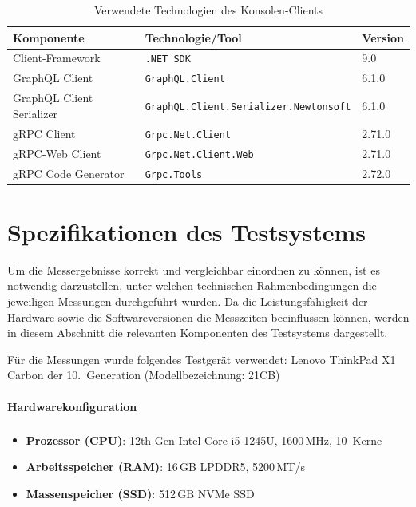 \begin{enumerate}
	\begin{table}[h]
		\centering
		\caption{Verwendete Technologien des Konsolen-Clients}
		\begin{tabular}{lll}
			\hline
			\textbf{Komponente} & \textbf{Technologie/Tool} & \textbf{Version} \\
			\hline
			Client-Framework & \texttt{.NET~SDK} & 9.0 \\
			GraphQL Client & \texttt{GraphQL.Client} & 6.1.0 \\
			GraphQL Client Serializer & \texttt{GraphQL.Client.Serializer.Newtonsoft} & 6.1.0 \\
			gRPC Client & \texttt{Grpc.Net.Client} & 2.71.0 \\
			gRPC-Web Client & \texttt{Grpc.Net.Client.Web} & 2.71.0 \\
			gRPC Code Generator & \texttt{Grpc.Tools} & 2.72.0 \\
			\hline
		\end{tabular}
	\end{table}
	
\end{enumerate}

\section{Spezifikationen des Testsystems}
Um die Messergebnisse korrekt und vergleichbar einordnen zu können, ist es notwendig darzustellen, unter welchen technischen Rahmenbedingungen die jeweiligen Messungen durchgeführt wurden. Da die Leistungsfähigkeit der Hardware sowie die Softwareversionen die Messzeiten beeinflussen können, werden in diesem Abschnitt die relevanten Komponenten des Testsystems dargestellt.

Für die Messungen wurde folgendes Testgerät verwendet:  
Lenovo ThinkPad X1 Carbon der 10.\ Generation (Modellbezeichnung: 21CB)

\paragraph{Hardwarekonfiguration}
\begin{itemize}
	\item \textbf{Prozessor (CPU)}: 12th Gen Intel\textsuperscript{\textregistered} Core\texttrademark{} i5-1245U, 1600\,MHz, 10~Kerne
	\item \textbf{Arbeitsspeicher (RAM)}: 16\,GB LPDDR5, 5200\,MT/s
	\item \textbf{Massenspeicher (SSD)}: 512\,GB NVMe SSD
\end{itemize}

